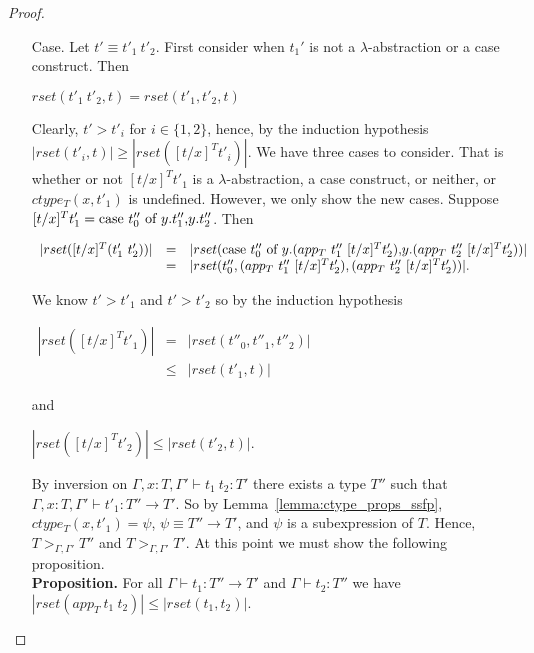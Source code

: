 \begin{proof}
\begin{itemize}
\item[Case.] Let $t' \equiv t'_1\ t'_2$.  First consider when $t_1'$ is not a $\lambda$-abstraction or a case construct. Then
  \begin{center}
    $rset(t'_1\ t'_2, t) = rset(t'_1, t'_2, t)$
  \end{center}  
  Clearly,  $t' > t'_i$ for $i \in \{1,2\}$, hence, by the induction hypothesis $|rset(t'_i,t)| \geq |rset([t/x]^T t'_i)|$.  
  We have three cases to consider.  That is whether or not $[t/x]^T t'_1$ is a $\lambda$-abstraction, 
  a case construct, or neither, or $ctype_T(x,t'_1)$ is undefined. However, we only show the new cases. 
  Suppose $[t/x]^T t'_1 = \mbox{case}\ t''_0\ \text{of}\ y\text{.}t''_1\text{,}y\text{.}t''_2$. Then 
  \begin{center}
    \small
    \begin{math}
      \begin{array}{lll}
        |rset([t/x]^T (t'_1\ t'_2))| & = & |rset(\ccon{t''_0}{y}{(app_T\ t''_1\ [t/x]^T t'_2)}{(app_T\ t''_2\ [t/x]^T t'_2)})|\\
        & = & |rset(t''_0, (app_T\ t''_1\ [t/x]^T t'_2), (app_T\ t''_2\ [t/x]^T t'_2))|.
      \end{array}
    \end{math}
  \end{center}
  We know $t' > t'_1$ and $t' > t'_2$ so by the induction hypothesis
  \begin{center}
    \begin{math}
      \begin{array}{lll}
        |rset([t/x]^T t'_1)| & =    & |rset(t''_0, t''_1,t''_2)|\\
        & \leq & |rset(t'_1,t)|
      \end{array}
    \end{math}
  \end{center}
  and
  \begin{center}
    \begin{math}
      |rset([t/x]^T t'_2)| \leq |rset(t'_2,t)|.
    \end{math}
  \end{center}
  By inversion on $\Gamma,x:T,\Gamma' \vdash t_1\ t_2:T'$ there exists a type $T''$ such that
  $\Gamma,x:T,\Gamma' \vdash t'_1:T'' \to T'$.  So by Lemma~\ref{lemma:ctype_props_ssfp},
  $ctype_T(x,t'_1) = \psi$, $\psi \equiv T'' \to T'$, and $\psi$ is a subexpression of $T$.  Hence,
  $T >_{\Gamma,\Gamma'} T''$ and $T >_{\Gamma,\Gamma'} T'$.  At this point we must show the following
  proposition.
  \ \\
  {\bf Proposition.}  For all $\Gamma \vdash t_1:T'' \to T'$ and $\Gamma \vdash t_2:T''$ we have \\
  $|rset(app_T\ t_1\ t_2)| \leq |rset(t_1,t_2)|$.
  

\end{itemize}
\end{proof}
